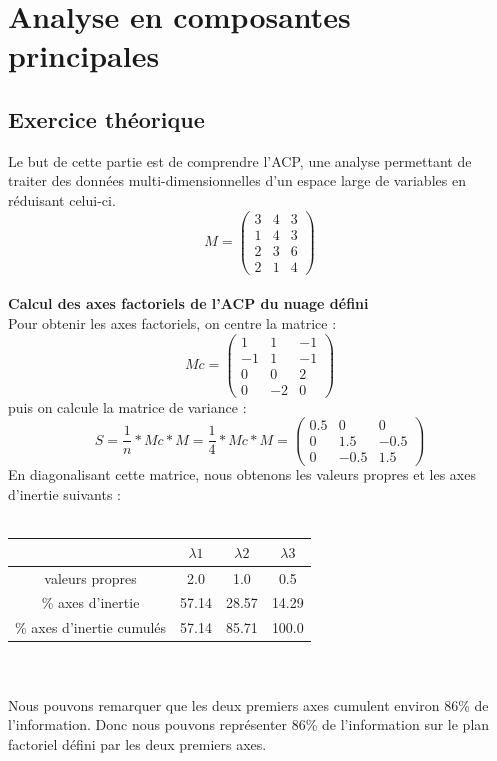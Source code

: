 ﻿\documentclass[a4paper, 9pt]{article}
\begin{document}
\newpage
\section{Analyse en composantes principales}
\subsection{Exercice th\'eorique}


Le but de cette partie est de comprendre l'ACP, une analyse permettant de traiter des donn\'ees multi-dimensionnelles d'un espace
large de variables en r\'eduisant celui-ci.
\[M =
\begin{pmatrix}
3 & 4 & 3\\
1 & 4 & 3\\
2 & 3 & 6\\
2 & 1 & 4
\end{pmatrix}\]\\
\textbf{Calcul des axes factoriels de l'ACP du nuage d\'efini}\\
Pour obtenir les axes factoriels, on centre la matrice :
\[Mc =
\begin{pmatrix}
1 & 1 & -1\\
-1 & 1 & -1\\
0 & 0 & 2\\
0 & -2 & 0
\end{pmatrix}\]
puis on calcule la matrice de variance :
\[S = \frac{1}{n}*Mc*M = \frac{1}{4}*Mc*M =
\begin{pmatrix}
0.5 & 0 & 0\\
0 & 1.5 & -0.5\\
0 & -0.5 & 1.5
\end{pmatrix}\]
En diagonalisant cette matrice, nous obtenons les valeurs propres et les axes d'inertie suivants :\\ \\
\begin{tabular}{|c|c|c|c|}
\hline
 & $\lambda1$ & $\lambda2$ & $\lambda3$\\
\hline
valeurs propres & 2.0 & 1.0 & 0.5\\
\hline
\% axes d'inertie & 57.14 & 28.57 & 14.29\\
\hline
\% axes d'inertie cumul\'es & 57.14 & 85.71 & 100.0\\
\hline
\end{tabular}\\ \\
Nous pouvons remarquer que les deux premiers axes cumulent environ 86\% de l'information.
Donc nous pouvons repr\'esenter 86\% de l'information sur le plan factoriel d\'efini par les deux premiers axes.\\
\end{document}
